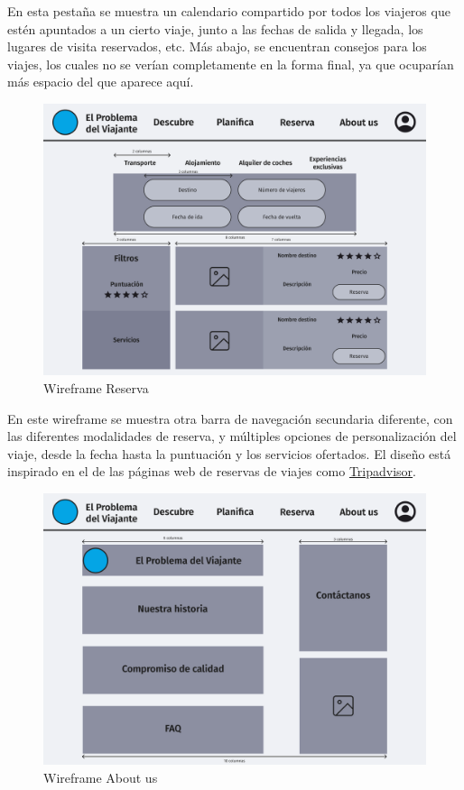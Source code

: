 \documentclass[11pt, a4paper]{book}
\begin{document}
	En esta pestaña se muestra un calendario compartido por todos los viajeros que estén apuntados a un cierto viaje, junto a las fechas de salida y llegada, los lugares de visita reservados, etc. Más abajo, se encuentran consejos para los viajes, los cuales no se verían completamente en la forma final, ya que ocuparían más espacio del que aparece aquí.

	\newpage
	
	\begin{figure} [H]
		\centering
		\includegraphics[width=\textwidth]{wireframe-reserva.png}
		\caption{Wireframe Reserva}
	\end{figure}

	En este wireframe se muestra otra barra de navegación secundaria diferente, con las diferentes modalidades de reserva, y múltiples opciones de personalización del viaje, desde la fecha hasta la puntuación y los servicios ofertados. El diseño está inspirado en el de las páginas web de reservas de viajes como \href{https://www.tripadvisor.es/Hotels-g186338-London_England-Hotels.html}{Tripadvisor}.
	
	\newpage
	
	\begin{figure} [H]
		\centering
		\includegraphics[width=\textwidth]{wireframe-about_us.png}
		\caption{Wireframe About us}
	\end{figure}
	
\end{document}
